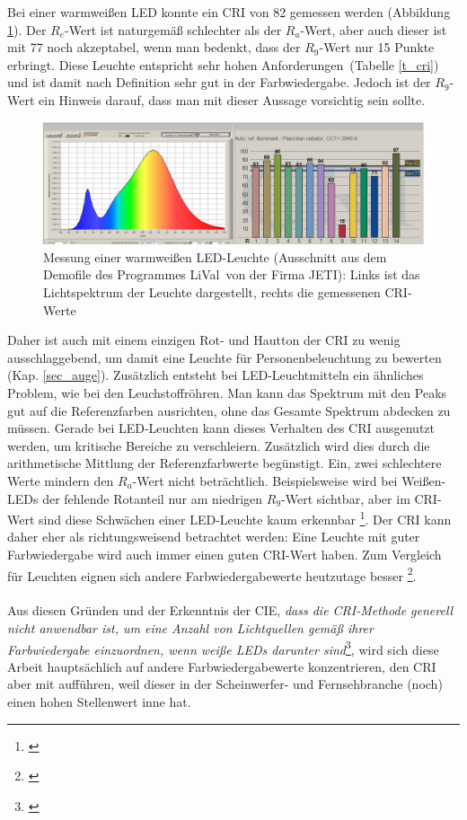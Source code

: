 Bei einer warmweißen LED konnte ein CRI von 82 gemessen werden (Abbildung \ref{b_cri2}). Der $R_{e}$-Wert ist naturgemäß schlechter als der $R_{a}$-Wert, aber auch dieser ist mit 77 noch akzeptabel, wenn man bedenkt, dass der $R_{9}$-Wert nur 15 Punkte erbringt. Diese Leuchte entspricht \glqq sehr hohen Anforderungen\grqq\ (Tabelle \ref{t_cri}) und ist damit nach Definition sehr gut in der Farbwiedergabe. Jedoch ist der $R_{9}$-Wert ein Hinweis darauf, dass man mit dieser Aussage vorsichtig sein sollte.

\begin{figure}[htp]     %
\centering
\includegraphics[width=1.0\textwidth]{bilder/cri2} 
\caption {Messung einer warmweißen LED-Leuchte (Ausschnitt aus dem Demofile des Programmes \glqq LiVal\grqq\ von der Firma JETI): Links ist das Lichtspektrum der Leuchte dargestellt, rechts die gemessenen CRI-Werte  \protect\footnotemark}\label{b_cri2}
\end{figure}

Daher ist auch mit einem einzigen Rot- und Hautton der CRI zu wenig ausschlaggebend, um damit eine Leuchte für Personenbeleuchtung zu bewerten (Kap. \ref{sec_auge}). Zusätzlich entsteht bei LED-Leuchtmitteln ein ähnliches Problem, wie bei den Leuchstoffröhren. Man kann das Spektrum mit den Peaks gut auf die Referenzfarben ausrichten, ohne das Gesamte Spektrum abdecken zu müssen. Gerade bei LED-Leuchten kann dieses Verhalten des CRI ausgenutzt werden, um kritische Bereiche zu verschleiern. Zusätzlich wird dies durch die arithmetische Mittlung der Referenzfarbwerte begünstigt. Ein, zwei schlechtere Werte mindern den $R_{a}$-Wert nicht beträchtlich. Beispielsweise wird bei Weißen-LEDs der fehlende Rotanteil nur am niedrigen $R_{9}$-Wert sichtbar, aber im CRI-Wert sind diese Schwächen einer LED-Leuchte kaum erkennbar \footnote{\cite{davis_ohno}}. Der CRI kann daher eher als richtungsweisend betrachtet werden: Eine Leuchte mit guter Farbwiedergabe wird auch immer einen guten CRI-Wert haben. Zum Vergleich für Leuchten eignen sich andere Farbwiedergabewerte heutzutage besser \footnote{\cite{production partner}}.\\\\
Aus diesen Gründen und der Erkenntnis der CIE, \emph{\glqq dass die CRI-Methode generell nicht anwendbar ist, um eine Anzahl von Lichtquellen gemäß ihrer Farbwiedergabe einzuordnen, wenn weiße LEDs darunter sind\grqq}\footnote{\citep[VI]{CIE}}, wird sich diese Arbeit hauptsächlich auf andere Farbwiedergabewerte konzentrieren, den CRI aber mit aufführen, weil dieser in der Scheinwerfer- und Fernsehbranche (noch) einen hohen Stellenwert inne hat.


